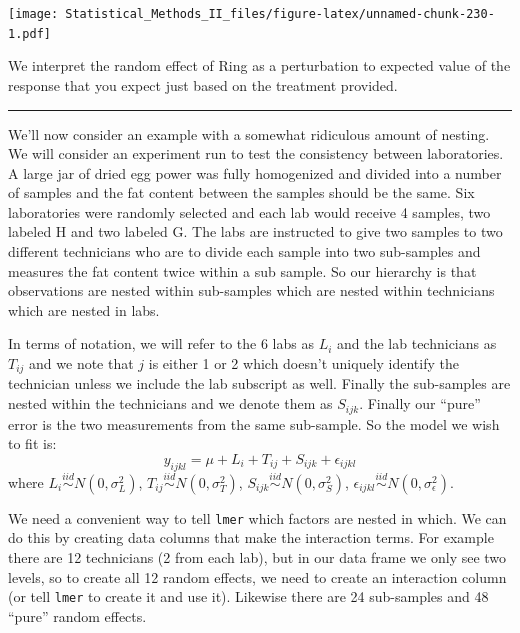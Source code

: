 \documentclass[]{book}
\theoremstyle{definition}
\theoremstyle{definition}
\theoremstyle{remark}
\begin{document}
\texttt{[image: Statistical\_Methods\_II\_files/figure-latex/unnamed-chunk-230-1.pdf]}

We interpret the random effect of Ring as a perturbation to expected
value of the response that you expect just based on the treatment
provided.

\begin{center}\rule{0.5\linewidth}{\linethickness}\end{center}

We'll now consider an example with a somewhat ridiculous amount of
nesting. We will consider an experiment run to test the consistency
between laboratories. A large jar of dried egg power was fully
homogenized and divided into a number of samples and the fat content
between the samples should be the same. Six laboratories were randomly
selected and each lab would receive 4 samples, two labeled H and two
labeled G. The labs are instructed to give two samples to two different
technicians who are to divide each sample into two sub-samples and
measures the fat content twice within a sub sample. So our hierarchy is
that observations are nested within sub-samples which are nested within
technicians which are nested in labs.

In terms of notation, we will refer to the 6 labs as \(L_{i}\) and the
lab technicians as \(T_{ij}\) and we note that \(j\) is either 1 or 2
which doesn't uniquely identify the technician unless we include the lab
subscript as well. Finally the sub-samples are nested within the
technicians and we denote them as \(S_{ijk}\). Finally our ``pure''
error is the two measurements from the same sub-sample. So the model we
wish to fit is: \[y_{ijkl}=\mu+L_{i}+T_{ij}+S_{ijk}+\epsilon_{ijkl}\]
where \(L_{i}\stackrel{iid}{\sim}N\left(0,\sigma_{L}^{2}\right)\),
\(T_{ij}\stackrel{iid}{\sim}N\left(0,\sigma_{T}^{2}\right)\),
\(S_{ijk}\stackrel{iid}{\sim}N\left(0,\sigma_{S}^{2}\right)\),
\(\epsilon_{ijkl}\stackrel{iid}{\sim}N\left(0,\sigma_{\epsilon}^{2}\right)\).

We need a convenient way to tell \texttt{lmer} which factors are nested
in which. We can do this by creating data columns that make the
interaction terms. For example there are 12 technicians (2 from each
lab), but in our data frame we only see two levels, so to create all 12
random effects, we need to create an interaction column (or tell
\texttt{lmer} to create it and use it). Likewise there are 24
sub-samples and 48 ``pure'' random effects.
\end{document}
